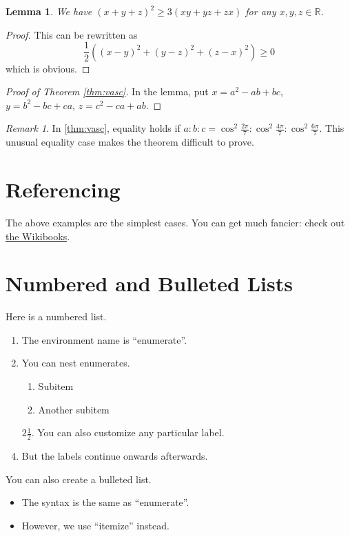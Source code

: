 \documentclass[11pt]{article}
\theoremstyle{plain} %
\newtheorem*{lemma}{Lemma}
\theoremstyle{definition}
\theoremstyle{example}
\theoremstyle{remark}
\newtheorem*{remark}{Remark}
\newcommand{\half}{\frac{1}{2}}
\begin{document}
\begin{lemma}
	We have $\left( x+y+z \right)^2 \ge 3(xy+yz+zx)$ for any $x,y,z \in \mathbb R$.
\end{lemma}
\begin{proof}
	This can be rewritten as
	\[ \half\left( (x-y)^2+(y-z)^2+(z-x)^2 \right) \ge 0 \]
	which is obvious.
\end{proof}

\begin{proof}
	[Proof of Theorem \ref{thm:vasc}]
	In the lemma, put $x=a^2-ab+bc$, $y=b^2-bc+ca$, $z=c^2-ca+ab$.
\end{proof}

\begin{remark}
	In \autoref{thm:vasc}, equality holds if $a : b : c = \cos^2 \frac{2\pi}{7} : \cos^2 \frac{4\pi}{7} : \cos^2 \frac{6\pi}{7}$.
	This unusual equality case makes the theorem difficult to prove.
\end{remark}


\section{Referencing}
The above examples are the simplest cases.
You can get much fancier: check out
\href{http://en.wikibooks.org/wiki/LaTeX/Labels_and_Cross-referencing}{the Wikibooks}.

\section{Numbered and Bulleted Lists}
Here is a numbered list.
\begin{enumerate}
	\item The environment name is ``enumerate''.
	\item You can nest enumerates.
		\begin{enumerate}
			\item Subitem
			\item Another subitem
		\end{enumerate}
	\item[$2 \half$.] You can also customize any particular label.
	\item But the labels continue onwards afterwards.
\end{enumerate}

\bigskip

You can also create a bulleted list.
\begin{itemize}
	\item The syntax is the same as ``enumerate''.
	\item However, we use ``itemize'' instead.
\end{itemize}
\end{document}
